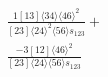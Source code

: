 \documentclass[varwidth, border=5pt]{standalone}
\begin{document}
\begin{my}
$\begin{gathered}
\scriptscriptstyle\frac{1[13]⟨34⟩⟨46⟩^2}{[23]⟨24⟩^2⟨56⟩s_{123}}+\\
\scriptscriptstyle\frac{-3[12]⟨46⟩^2}{[23]⟨24⟩⟨56⟩s_{123}}\phantom{+}
\end{gathered}$
\end{my}
\end{document}
